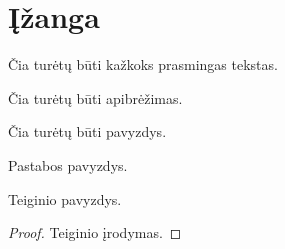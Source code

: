 \chapter{Įžanga}

Čia turėtų būti kažkoks prasmingas tekstas.

\begin{defn}
  Čia turėtų būti apibrėžimas.
\end{defn}

\begin{exmp}[Pavyzdys]
  Čia turėtų būti pavyzdys.
\end{exmp}

\begin{note}
  Pastabos pavyzdys.
\end{note}

\begin{prop}
  Teiginio pavyzdys.
  \begin{proof}
    Teiginio įrodymas.
  \end{proof}
\end{prop}
